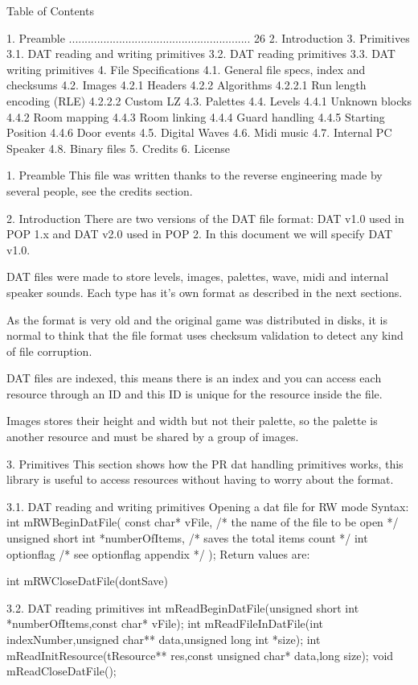 Table of Contents

1. Preamble .......................................................... 26
2. Introduction
3. Primitives
3.1. DAT reading and writing primitives
3.2. DAT reading primitives
3.3. DAT writing primitives
4. File Specifications
4.1. General file specs, index and checksums
4.2. Images
4.2.1 Headers
4.2.2 Algorithms
4.2.2.1 Run length encoding (RLE)
4.2.2.2 Custom LZ
4.3. Palettes
4.4. Levels
4.4.1 Unknown blocks
4.4.2 Room mapping
4.4.3 Room linking
4.4.4 Guard handling
4.4.5 Starting Position
4.4.6 Door events 
4.5. Digital Waves
4.6. Midi music
4.7. Internal PC Speaker
4.8. Binary files
5. Credits
6. License

1. Preamble
 This file was written thanks to the reverse engineering made by several
 people, see the credits section.

2. Introduction
 There are two versions of the DAT file format: DAT v1.0 used in POP 1.x
 and DAT v2.0 used in POP 2. In this document we will specify DAT v1.0.

 DAT files were made to store levels, images, palettes, wave, midi and
 internal speaker sounds. Each type has it's own format as described in
 the next sections.
 
 As the format is very old and the original game was distributed in disks,
 it is normal to think that the file format uses checksum validation to
 detect any kind of file corruption.

 DAT files are indexed, this means there is an index and you can access
 each resource through an ID and this ID is unique for the resource inside
 the file.

 Images stores their height and width but not their palette, so the palette
 is another resource and must be shared by a group of images.

3. Primitives
 This section shows how the PR dat handling primitives works, this library
 is useful to access resources without having to worry about the format.

3.1. DAT reading and writing primitives
 Opening a dat file for RW mode
 Syntax:
 int mRWBeginDatFile(
  const char* vFile, /* the name of the file to be open */
  unsigned short int *numberOfItems, /* saves the total items count */
  int optionflag /* see optionflag appendix */
 );
 Return values are:

 int mRWCloseDatFile(dontSave)

3.2. DAT reading primitives
 int  mReadBeginDatFile(unsigned short int *numberOfItems,const char* vFile);
 int  mReadFileInDatFile(int indexNumber,unsigned char** data,unsigned long int
*size);
 int  mReadInitResource(tResource** res,const unsigned char* data,long size);
 void mReadCloseDatFile();


